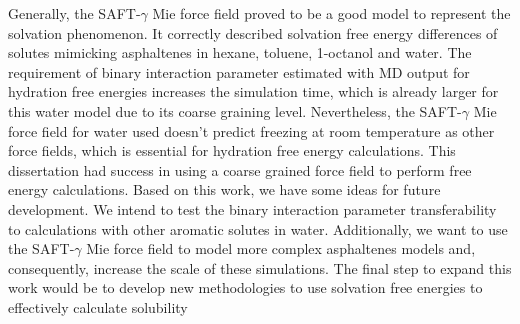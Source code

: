 Generally, the SAFT-$\gamma$ Mie force field proved to be a good model to represent the solvation
phenomenon. It correctly described solvation free energy differences of solutes
mimicking asphaltenes in hexane, toluene, 1-octanol and water. The requirement of
binary interaction parameter estimated with MD output for hydration free energies
increases the simulation time, which is already larger for this water model due to its
coarse graining level. Nevertheless, the SAFT-$\gamma$ Mie force field for water used doesn’t predict freezing at room temperature as other force fields, which is essential for hydration
free energy calculations.
This dissertation had success in using a coarse grained force field to perform
free energy calculations. Based on this work, we have some ideas for future development. We intend to test the binary interaction parameter transferability to calculations with other
aromatic solutes in water. Additionally, we want to use the SAFT-$\gamma$ Mie force field to model more
complex asphaltenes models and, consequently, increase the scale of these simulations. The final step to expand this work would be to develop new methodologies to use solvation free energies to effectively calculate solubility


